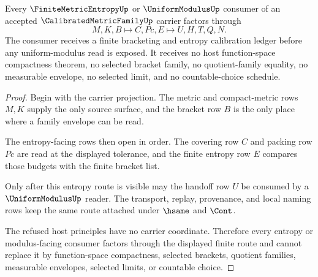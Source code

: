 \begin{theorem}
\label{thm:calibrated-metric-family-entropy-handoff}
Every $\FiniteMetricEntropyUp$ or $\UniformModulusUp$ consumer of an accepted $\CalibratedMetricFamilyUp$ carrier factors through
$$
M,K,B \longmapsto C,Pc,E \longmapsto U,H,T,Q,N .
$$
The consumer receives a finite bracketing and entropy calibration ledger before any uniform-modulus read is exposed. It receives no host function-space compactness theorem, no selected bracket family, no quotient-family equality, no measurable envelope, no selected limit, and no countable-choice schedule.
\end{theorem}
\begin{proof}
Begin with the carrier projection. The metric and compact-metric rows $M,K$ supply the only source surface, and the bracket row $B$ is the only place where a family envelope can be read.

The entropy-facing rows then open in order. The covering row $C$ and packing row $Pc$ are read at the displayed tolerance, and the finite entropy row $E$ compares those budgets with the finite bracket list.

Only after this entropy route is visible may the handoff row $U$ be consumed by a $\UniformModulusUp$ reader. The transport, replay, provenance, and local naming rows keep the same route attached under $\hsame$ and $\Cont$.

The refused host principles have no carrier coordinate. Therefore every entropy or modulus-facing consumer factors through the displayed finite route and cannot replace it by function-space compactness, selected brackets, quotient families, measurable envelopes, selected limits, or countable choice.
\end{proof}



